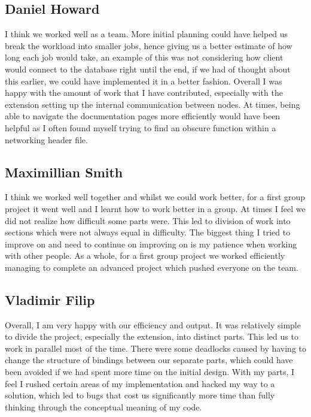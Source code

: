 \documentclass[11pt]{article}
\begin{document}
\subsection{Daniel Howard}

I think we worked well as a team. More initial planning could have helped us break the workload into smaller jobs, hence giving us a better estimate of how long each job would take, an example of this was not considering how client would connect to the database right until the end, if we had of thought about this earlier, we could have implemented it in a better fashion. Overall I was happy with the amount of work that I have contributed, especially with the extension setting up the internal communication between nodes. At times, being able to navigate the documentation pages more efficiently would have been helpful as I often found myself trying to find an obscure function within a networking header file.

\subsection{Maximillian Smith}

 I think we worked well together and whilst we could work better, for a first group project it went well and I learnt how to work better in a group. At times I feel we did not realize how difficult some parts were. This led to division of work into sections which were not always equal in difficulty. The biggest thing I tried to improve on and need to continue on improving on is my patience when working with other people. As a whole, for a first group project we worked efficiently managing to complete an advanced project which pushed everyone on the team.

\subsection{Vladimir Filip}

Overall, I am very happy with our efficiency and output. It was relatively simple to divide the project, especially the extension, into distinct parts. This led us to work in parallel most of the time. There were some deadlocks caused by having to change the structure of bindings between our separate parts, which could have been avoided if we had spent more time on the initial design. With my parts, I feel I rushed certain areas of my implementation and hacked my way to a solution, which led to bugs that cost us significantly more time than fully thinking through the conceptual meaning of my code.

\printbibliography
\end{document}
